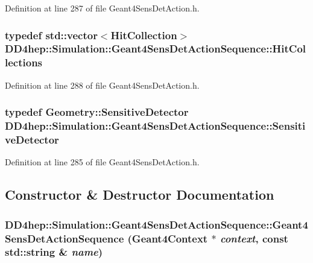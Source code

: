 Definition at line 287 of file Geant4SensDetAction.h.\hypertarget{class_d_d4hep_1_1_simulation_1_1_geant4_sens_det_action_sequence_aabeb325e4b6af156cbae3578b00301b3}{
\subsubsection[{HitCollections}]{\setlength{\rightskip}{0pt plus 5cm}typedef std::vector$<${\bf HitCollection}$>$ {\bf DD4hep::Simulation::Geant4SensDetActionSequence::HitCollections}}}
\label{class_d_d4hep_1_1_simulation_1_1_geant4_sens_det_action_sequence_aabeb325e4b6af156cbae3578b00301b3}


Definition at line 288 of file Geant4SensDetAction.h.\hypertarget{class_d_d4hep_1_1_simulation_1_1_geant4_sens_det_action_sequence_a9d428afdc7b9189bce5dab4f16db17fb}{
\subsubsection[{SensitiveDetector}]{\setlength{\rightskip}{0pt plus 5cm}typedef {\bf Geometry::SensitiveDetector} {\bf DD4hep::Simulation::Geant4SensDetActionSequence::SensitiveDetector}}}
\label{class_d_d4hep_1_1_simulation_1_1_geant4_sens_det_action_sequence_a9d428afdc7b9189bce5dab4f16db17fb}


Definition at line 285 of file Geant4SensDetAction.h.

\subsection{Constructor \& Destructor Documentation}
\hypertarget{class_d_d4hep_1_1_simulation_1_1_geant4_sens_det_action_sequence_a6930930d7fb224b53979dd6decc4907b}{
\subsubsection[{Geant4SensDetActionSequence}]{\setlength{\rightskip}{0pt plus 5cm}DD4hep::Simulation::Geant4SensDetActionSequence::Geant4SensDetActionSequence ({\bf Geant4Context} $\ast$ {\em context}, \/  const std::string \& {\em name})}}
\label{class_d_d4hep_1_1_simulation_1_1_geant4_sens_det_action_sequence_a6930930d7fb224b53979dd6decc4907b}


